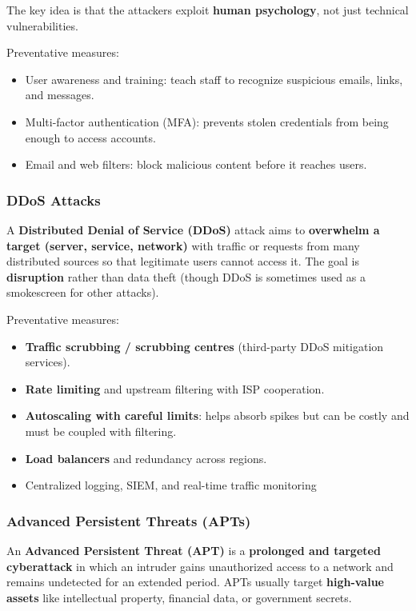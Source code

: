 The key idea is that the attackers exploit \textbf{human psychology}, not just technical vulnerabilities.

Preventative measures:

\begin{itemize}
    \item User awareness and training: teach staff to recognize suspicious emails, links, and messages.
    \item Multi-factor authentication (MFA): prevents stolen credentials from being enough to access accounts.
    \item Email and web filters: block malicious content before it reaches users.
\end{itemize}

\subsubsection{DDoS Attacks}

\indent 

A \textbf{Distributed Denial of Service (DDoS)} attack aims to \textbf{overwhelm a target (server, service, network)} with traffic or requests from many distributed sources so that legitimate users cannot access it. The goal is \textbf{disruption} rather than data theft (though DDoS is sometimes used as a smokescreen for other attacks).

Preventative measures:

\begin{itemize}
    \item \textbf{Traffic scrubbing / scrubbing centres} (third-party DDoS mitigation services).
    \item \textbf{Rate limiting} and upstream filtering with ISP cooperation.
    \item \textbf{Autoscaling with careful limits}: helps absorb spikes but can be costly and must be coupled with filtering.
    \item \textbf{Load balancers} and redundancy across regions.
    \item Centralized logging, SIEM, and real-time traffic monitoring
\end{itemize}

\subsubsection{Advanced Persistent Threats (APTs)}

\indent 

An \textbf{Advanced Persistent Threat (APT)} is a \textbf{prolonged and targeted cyberattack} in which an intruder gains unauthorized access to a network and remains undetected for an extended period. APTs usually target \textbf{high-value assets} like intellectual property, financial data, or government secrets.


